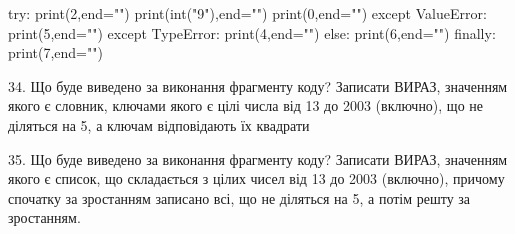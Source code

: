 \documentclass[11pt]{article}
\begin{document}
try:
    print(2,end="")
    print(int("9"),end="")
    print(0,end="")
except ValueError: print(5,end="")
except TypeError: print(4,end="")
else: print(6,end="")
finally: print(7,end="")


34. Що буде виведено за виконання фрагменту коду?
Записати ВИРАЗ, значенням якого є словник, ключами якого є цілі числа від 13 до 2003 (включно), що не діляться на 5, а ключам відповідають їх квадрати 

35. Що буде виведено за виконання фрагменту коду?
Записати ВИРАЗ, значенням якого є список, що складається з цілих чисел від 13 до 2003 (включно), причому спочатку за зростанням записано всі, що не діляться на 5, а потім решту за зростанням.




































\newpage
\end{document}
